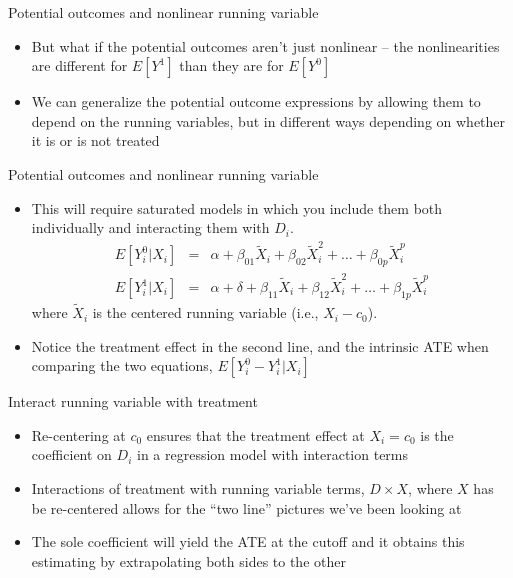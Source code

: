 \documentclass{beamer}
\begin{document}
\begin{frame}{Potential outcomes and nonlinear running variable}
	
	\begin{itemize}
	\item But what if the potential outcomes aren't just nonlinear -- the nonlinearities are different for $E[Y^1]$ than they are for $E[Y^0]$
	\item We can generalize the potential outcome expressions by allowing them to depend on the running variables, but in different ways depending on whether it is or is not treated
	\end{itemize}
\end{frame}


\begin{frame}{Potential outcomes and nonlinear running variable}
	
	\begin{itemize}
	\item This will require saturated models in which you include them both individually and interacting them with $D_i$.  
		\begin{eqnarray*}
		E[Y_i^0 | X_i] &=& \alpha + \beta_{01}\tilde{X}_i + \beta_{02}\tilde{X}_i^2 + \dots + \beta_{0p}\tilde{X}_i^p \\
		E[Y_i^1 | X_i] &=& \alpha + \delta + \beta_{11}\tilde{X}_i + \beta_{12}\tilde{X}_i^2 + \dots + \beta_{1p}\tilde{X}_i^p
		\end{eqnarray*}where $\tilde{X}_i$ is the centered running variable (i.e., $X_i - c_0$). 
	\item Notice the treatment effect in the second line, and the intrinsic ATE when comparing the two equations, $E[Y_i^0 - Y_i^1 | X_i]$	
	\end{itemize}
\end{frame}


\begin{frame}{Interact running variable with treatment}

\begin{itemize}
		\item Re-centering at $c_0$ ensures that the treatment effect at $X_i=c_0$ is the coefficient on $D_i$ in a regression model with interaction terms
		\item Interactions of treatment with running variable terms, $D \times X$, where $X$ has be re-centered allows for the ``two line'' pictures we've been looking at
		\item The sole coefficient will yield the ATE at the cutoff and it obtains this estimating by extrapolating both sides to the other
\end{itemize}

\end{frame}
\end{document}
